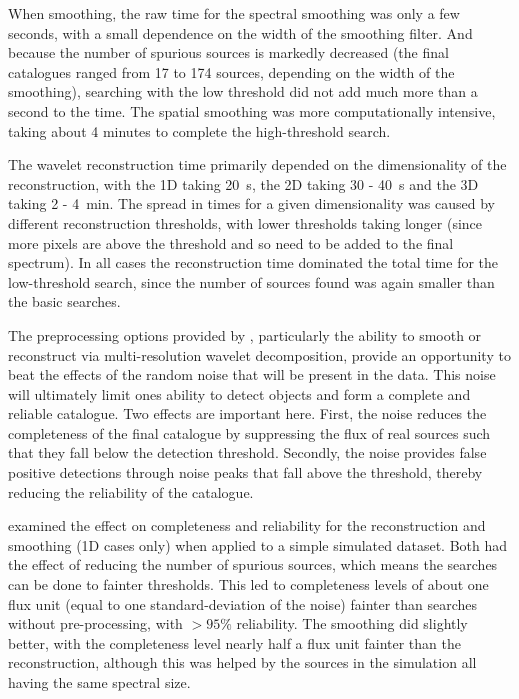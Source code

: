 When smoothing, the raw time for the spectral smoothing was only a few
seconds, with a small dependence on the width of the smoothing
filter. And because the number of spurious sources is markedly
decreased (the final catalogues ranged from 17 to 174 sources,
depending on the width of the smoothing), searching with the low
threshold did not add much more than a second to the time. The spatial
smoothing was more computationally intensive, taking about 4 minutes
to complete the high-threshold search.

The wavelet reconstruction time primarily depended on the
dimensionality of the reconstruction, with the 1D taking 20~s, the 2D
taking 30 - 40~s and the 3D taking 2 - 4~min. The spread in times for
a given dimensionality was caused by different reconstruction
thresholds, with lower thresholds taking longer (since more pixels are
above the threshold and so need to be added to the final spectrum). In
all cases the reconstruction time dominated the total time for the
low-threshold search, since the number of sources found was again
smaller than the basic searches.



The preprocessing options provided by \duchamp, particularly the
ability to smooth or reconstruct via multi-resolution wavelet
decomposition, provide an opportunity to beat the effects of the
random noise that will be present in the data. This noise will
ultimately limit ones ability to detect objects and form a complete
and reliable catalogue. Two effects are important here. First, the
noise reduces the completeness of the final catalogue by suppressing
the flux of real sources such that they fall below the detection
threshold. Secondly, the noise provides false positive detections
through noise peaks that fall above the threshold, thereby reducing
the reliability of the catalogue.

\citet{whiting12} examined the effect on completeness and reliability
for the reconstruction and smoothing (1D cases only) when applied to a
simple simulated dataset. Both had the effect of reducing the number
of spurious sources, which means the searches can be done to fainter
thresholds. This led to completeness levels of about one flux unit
(equal to one standard-deviation of the noise) fainter than searches
without pre-processing, with $>95\%$ reliability. The smoothing did
slightly better, with the completeness level nearly half a flux unit
fainter than the reconstruction, although this was helped by the
sources in the simulation all having the same spectral size.

